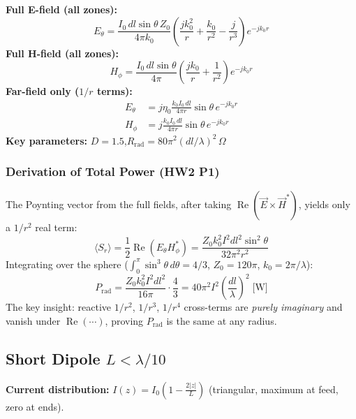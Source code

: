 \documentclass[10pt,letterpaper]{article}
\newcommand{\vE}{\vec{E}}
\newcommand{\vH}{\vec{H}}
\newcommand{\Real}{\operatorname{Re}}
\begin{document}
\begin{tcolorbox}[formulabox, title={Full Fields: Elementary Dipole}]
\textbf{Full E-field (all zones):}
\begin{equation}
  E_\theta = \frac{I_0\,dl\sin\theta\,Z_0}{4\pi k_0}\left(\frac{jk_0^2}{r} + \frac{k_0}{r^2} - \frac{j}{r^3}\right)e^{-jk_0 r}
\end{equation}
\textbf{Full H-field (all zones):}
\begin{equation}
  H_\phi = \frac{I_0\,dl\sin\theta}{4\pi}\left(\frac{jk_0}{r} + \frac{1}{r^2}\right)e^{-jk_0 r}
\end{equation}
\textbf{Far-field only ($1/r$ terms):}
\begin{align}
  E_\theta &= j\eta_0\frac{k_0 I_0\,dl}{4\pi r}\sin\theta\,e^{-jk_0 r} \\
  H_\phi &= j\frac{k_0 I_0\,dl}{4\pi r}\sin\theta\,e^{-jk_0 r}
\end{align}
\textbf{Key parameters:} $D = 1.5$,\quad $R_\mathrm{rad} = 80\pi^2(dl/\lambda)^2\,\Omega$
\end{tcolorbox}

\subsubsection{Derivation of Total Power (HW2 P1)}
The Poynting vector from the full fields, after taking $\Real(\vE\times\vH^*)$, yields only a $1/r^2$ real term:
\begin{equation}
  \langle S_r\rangle = \frac{1}{2}\Real(E_\theta H_\phi^*) = \frac{Z_0 k_0^2 I^2 dl^2 \sin^2\theta}{32\pi^2 r^2}
\end{equation}
Integrating over the sphere ($\int_0^\pi\sin^3\theta\,d\theta = 4/3$, $Z_0 = 120\pi$, $k_0=2\pi/\lambda$):
\begin{equation}
  P_\mathrm{rad} = \frac{Z_0 k_0^2 I^2 dl^2}{16\pi}\cdot\frac{4}{3} = 40\pi^2 I^2\left(\frac{dl}{\lambda}\right)^2 \;\text{[W]}
\end{equation}
The key insight: reactive $1/r^2$, $1/r^3$, $1/r^4$ cross-terms are \emph{purely imaginary} and vanish under $\Real(\cdots)$, proving $P_\mathrm{rad}$ is the same at any radius.

\subsection{Short Dipole $L < \lambda/10$}

\textbf{Current distribution:} $I(z) = I_0\!\left(1 - \frac{2|z|}{L}\right)$ (triangular, maximum at feed, zero at ends).
\end{document}
